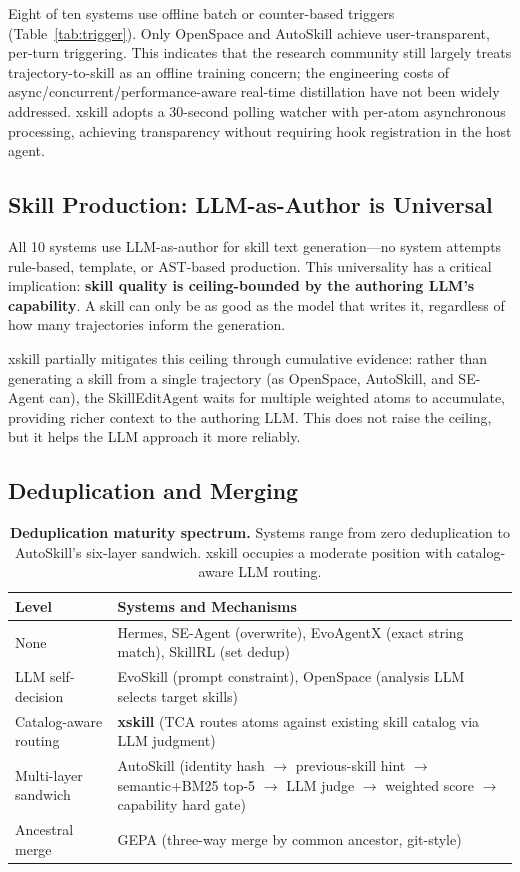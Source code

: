 \documentclass[11pt]{article}
\begin{document}
Eight of ten systems use offline batch or counter-based triggers (Table~\ref{tab:trigger}). Only OpenSpace and AutoSkill achieve user-transparent, per-turn triggering. This indicates that the research community still largely treats trajectory-to-skill as an offline training concern; the engineering costs of async/concurrent/performance-aware real-time distillation have not been widely addressed. xskill adopts a 30-second polling watcher with per-atom asynchronous processing, achieving transparency without requiring hook registration in the host agent.

\subsection{Skill Production: LLM-as-Author is Universal}

All 10 systems use LLM-as-author for skill text generation---no system attempts rule-based, template, or AST-based production. This universality has a critical implication: \textbf{skill quality is ceiling-bounded by the authoring LLM's capability}. A skill can only be as good as the model that writes it, regardless of how many trajectories inform the generation.

xskill partially mitigates this ceiling through cumulative evidence: rather than generating a skill from a single trajectory (as OpenSpace, AutoSkill, and SE-Agent can), the SkillEditAgent waits for multiple weighted atoms to accumulate, providing richer context to the authoring LLM. This does not raise the ceiling, but it helps the LLM approach it more reliably.

\subsection{Deduplication and Merging}

\begin{table}[t]
\centering
\caption{\textbf{Deduplication maturity spectrum.} Systems range from zero deduplication to AutoSkill's six-layer sandwich. xskill occupies a moderate position with catalog-aware LLM routing.}
\label{tab:dedup}
\small
\begin{tabular}{@{}lp{6.5cm}@{}}
\toprule
\textbf{Level} & \textbf{Systems and Mechanisms} \\
\midrule
None & Hermes, SE-Agent (overwrite), EvoAgentX (exact string match), SkillRL (set dedup) \\
LLM self-decision & EvoSkill (prompt constraint), OpenSpace (analysis LLM selects target skills) \\
Catalog-aware routing & \textbf{xskill} (TCA routes atoms against existing skill catalog via LLM judgment) \\
Multi-layer sandwich & AutoSkill (identity hash $\to$ previous-skill hint $\to$ semantic+BM25 top-5 $\to$ LLM judge $\to$ weighted score $\to$ capability hard gate) \\
Ancestral merge & GEPA (three-way merge by common ancestor, git-style) \\
\bottomrule
\end{tabular}
\end{table}
\end{document}
